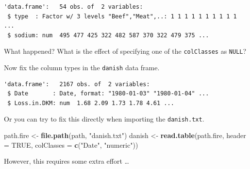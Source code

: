 \documentclass[
]{book}
\newenvironment{Shaded}{\begin{snugshade}}{\end{snugshade}}
\newcommand{\ControlFlowTok}[1]{\textcolor[rgb]{0.13,0.29,0.53}{\textbf{#1}}}
\newcommand{\DataTypeTok}[1]{\textcolor[rgb]{0.13,0.29,0.53}{#1}}
\newcommand{\KeywordTok}[1]{\textcolor[rgb]{0.13,0.29,0.53}{\textbf{#1}}}
\newcommand{\NormalTok}[1]{#1}
\newcommand{\OperatorTok}[1]{\textcolor[rgb]{0.81,0.36,0.00}{\textbf{#1}}}
\newcommand{\OtherTok}[1]{\textcolor[rgb]{0.56,0.35,0.01}{#1}}
\newcommand{\StringTok}[1]{\textcolor[rgb]{0.31,0.60,0.02}{#1}}
\begin{document}
\begin{verbatim}
'data.frame':	54 obs. of  2 variables:
 $ type  : Factor w/ 3 levels "Beef","Meat",..: 1 1 1 1 1 1 1 1 1 1 ...
 $ sodium: num  495 477 425 322 482 587 370 322 479 375 ...
\end{verbatim}

What happened? What is the effect of specifying one of the \texttt{colClasses} as \texttt{NULL}?

Now fix the column types in the \texttt{danish} data frame.

\begin{Shaded}
\end{Shaded}

\begin{verbatim}
'data.frame':	2167 obs. of  2 variables:
 $ Date       : Date, format: "1980-01-03" "1980-01-04" ...
 $ Loss.in.DKM: num  1.68 2.09 1.73 1.78 4.61 ...
\end{verbatim}

Or you can try to fix this directly when importing the \texttt{danish.txt}.

\begin{Shaded}
\begin{Highlighting}[]
\NormalTok{path.fire <-}\StringTok{ }\KeywordTok{file.path}\NormalTok{(path, }\StringTok{"danish.txt"}\NormalTok{)}
\NormalTok{danish <-}\StringTok{ }\KeywordTok{read.table}\NormalTok{(path.fire, }\DataTypeTok{header =} \OtherTok{TRUE}\NormalTok{, }\DataTypeTok{colClasses =} \KeywordTok{c}\NormalTok{(}\StringTok{"Date"}\NormalTok{, }\StringTok{"numeric"}\NormalTok{))}
\end{Highlighting}
\end{Shaded}

However, this requires some extra effort \ldots{}

\begin{Shaded}
\end{Shaded}
\end{document}
